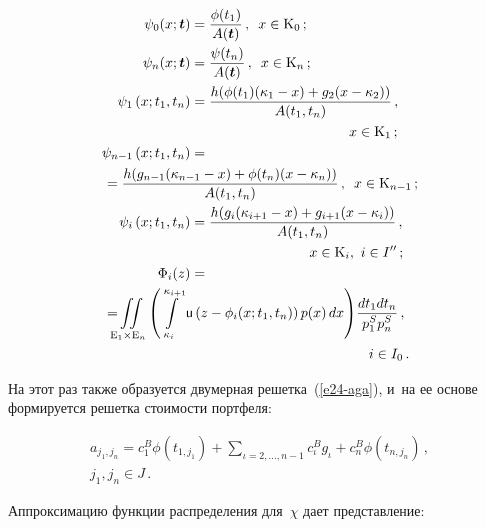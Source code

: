 \begin{multicols}{2}
\noindent
   \begin{align*}
   \psi_0(x;\boldsymbol{t}) &= \fr{\phi (t_1)}{A(\boldsymbol{t})}\,,\enskip 
   x\in \mathrm{K}_0\,;\\ 
   \psi_n(x; \boldsymbol{t})&=\fr{\psi(t_n)}{A(\boldsymbol{t})}\,,\enskip x\in \mathrm{K}_n\,;\\
      \psi_1\left(x; t_1, t_n\right) &=
      \fr{h(\phi(t_1) (\kappa_1-x)+g_2(x-\kappa_2))}{A(t_1,t_n)}\,,\\ 
      &\hspace*{40mm}x\in  \mathrm{K}_1\,;\\
   \psi_{n-1}\left( x; t_1, t_n\right) &={}\\
   &\hspace*{-22mm}{}=\fr{h(g_{n-1}(\kappa_{n-1}-x) +\phi(t_n) (x-
\kappa_n))}{A(t_1,t_n)}\,,\enskip x\in \mathrm{K}_{n-1}\,;\\
   \psi_i\left( x; t_1, t_n\right)& =\fr{h(g_i(\kappa_{i+1}-x) +g_{i+1}(x-\kappa_i))}{A(t_1,t_n)}\,,\\
&\hspace*{30mm}x\in \mathrm{K}_i,\ i\in I^{\prime\prime}\,;\\
\Phi_i(z)&={}\\
&  \hspace*{-22mm}{}=\!\!\iint\limits_{\mathrm{E}_1\times\mathrm{E}_n} \left( \int\limits_{\kappa_i}^{\kappa_{i+1}} 
{\sf u} \left( z-\phi_i(x; t_1, t_n)\right) p(x)\,dx\right)\!
\fr{dt_1dt_n}{p_1^S p_n^S}\,,\\
& \hspace*{45mm}i\in I_0\,.
   \end{align*}
   
   \vspace*{-2pt}
  
  На этот раз также образуется двумерная решетка~(\ref{e24-aga}), и~на ее 
основе формируется решетка стоимости портфеля:

\noindent
\begin{multline*}
  a_{j_1,j_n}=c_1^B\phi\left( t_{1,j_1}\right) +\sum\limits_{\iota=2,\ldots , n-1} \!\!
c_\iota^B g_\iota +c_n^B \phi \left( t_{n,j_n}\right)\,,\\ j_1, j_n\in J\,.
\end{multline*}
  
  Аппроксимацию функции распределения для~$\chi$ дает представление:
  

\end{multicols}
